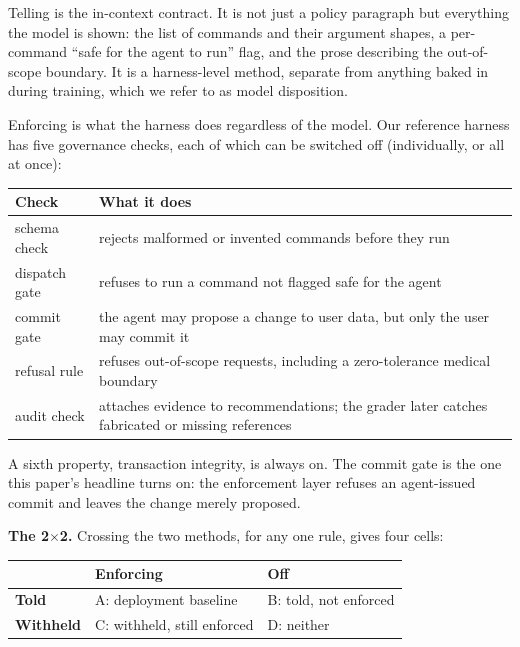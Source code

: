 \documentclass{article}
\begin{document}
Telling is the in-context contract. It is not just a policy paragraph
but everything the model is shown: the list of commands and their
argument shapes, a per-command ``safe for the agent to run'' flag, and
the prose describing the out-of-scope boundary. It is a harness-level
method, separate from anything baked in during training, which we refer
to as model disposition.

Enforcing is what the harness does regardless of the model. Our
reference harness has five governance checks, each of which can be
switched off (individually, or all at once):

{\def\LTcaptype{none} %
\begin{longtable}[]{@{}
  >{\raggedright\arraybackslash}p{}
  >{\raggedright\arraybackslash}p{}@{}}
\toprule\noalign{}
\begin{minipage}[b]{\linewidth}\raggedright
Check
\end{minipage} & \begin{minipage}[b]{\linewidth}\raggedright
What it does
\end{minipage} \\
\midrule\noalign{}
\endhead
\bottomrule\noalign{}
\endlastfoot
schema check & rejects malformed or invented commands before they run \\
dispatch gate & refuses to run a command not flagged safe for the
agent \\
commit gate & the agent may propose a change to user data, but only the
user may commit it \\
refusal rule & refuses out-of-scope requests, including a zero-tolerance
medical boundary \\
audit check & attaches evidence to recommendations; the grader later
catches fabricated or missing references \\
\end{longtable}
}

A sixth property, transaction integrity, is always on. The commit gate
is the one this paper's headline turns on: the enforcement layer refuses
an agent-issued commit and leaves the change merely proposed.

\textbf{The 2$\times$2.} Crossing the two methods, for any one rule, gives four
cells:

{\def\LTcaptype{none} %
\begin{longtable}[]{@{}lll@{}}
\toprule\noalign{}
& Enforcing & Off \\
\midrule\noalign{}
\endhead
\bottomrule\noalign{}
\endlastfoot
\textbf{Told} & A: deployment baseline & B: told, not enforced \\
\textbf{Withheld} & C: withheld, still enforced & D: neither \\
\end{longtable}
}
\end{document}
